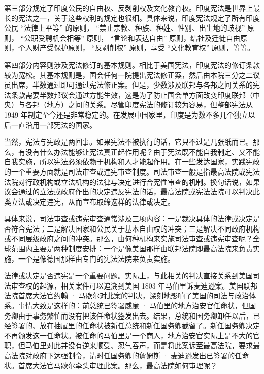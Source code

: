 第三部分规定了印度公民的自由权、反剥削权及文化教育权。印度宪法是世界上最长的宪法之一，关于这些权利的规定也很细。具体来说，印度宪法规定了所有印度公民 “法律上平等” 的原则， “禁止宗教、种族、种姓、性别、出生地的歧视” 原则， “公职受聘机会相等” 原则， “言论和表达自由” 原则，结社及迁徙自由原则，个人财产受保护原则， “反剥削权” 原则，享受 “文化教育权” 原则，等等。

第四部分内容则涉及宪法修订的基本规则。相比于美国宪法，印度宪法的修订条款较为宽松。其基本规则是，国会任何一院提出宪法修正案，然后由本院三分之二议员出席，半数通过即可通过宪法修正案。但是，少数涉及联邦与各邦之间关系的宪法条款需要半数邦议会通过方能生效，这是为了防止国会单方面改变印度联邦（中央）与各邦（地方）之间的关系。尽管印度宪法的修订较为容易，但整部宪法从 1949 年制定至今还是非常稳定的。在发展中国家里，印度是为数不多几个独立以后一直沿用一部宪法的国家。


当然，宪法与宪政是两回事。如果宪法不被执行的话，它只不过是几张纸而已。那么，有没有什么办法能够让宪法真正起作用呢？由于宪法既不能自我制定、又不能自我实施，所以宪法必须依赖于机构和人才能起作用。在一些发达国家，实践宪政的一个重要方面就是司法审查或违宪审查制度。司法审查一般是指最高法院或宪法法院对行政机构或立法机构的法律与决定进行合宪性审查的机制。换句话说，如果议会通过的立法或政府作出的决定违反宪法的话，最高法院或宪法法院可以判决此类立法或决定违宪，从而宣布取缔这样的法律或决定。

具体来说，司法审查或违宪审查通常涉及三项内容：一是裁决具体的法律或决定是否符合宪法；二是解决国家和公民关于基本自由权的冲突；三是解决不同政府机构或不同层级政府之间的冲突。那么，由何种机构来实施司法审查或违宪审查呢？全球范围内主要是两种制度安排：一个是像美国那样由联邦法院即最高法院来负责实施，一个是像德国那样由专门的宪法法院来负责实施。

法律或决定是否违宪是一个重要问题。实际上，与此相关的判决直接关系到美国司法审查权的起源，相关案件可以追溯到美国 1803 年马伯里诉麦迪逊案。美国联邦法院首席大法官约翰 · 马歇尔对此案的判决，深刻地影响了美国的司法与政治体系。事情大致是这样的：前总统已签署威廉 · 马伯里的地方治安官任命状，但国务卿由于事务繁忙而没有把该任命状签发出去。结果，总统和国务卿卸任以后，已经签署的、放在抽屉里的任命状被新任总统和新任国务卿截留了。新任国务卿决定不再颁发这一任命状。被任命的马伯里是一个商人，地方治安官实际上是不大的官职，但马伯里对此并没有逆来顺受、忍气吞声，而是将此案诉至最高法院，要求最高法院对政府下达强制令，请时任国务卿的詹姆斯 · 麦迪逊发出已签署的任命状。首席大法官马歇尔牵头审理此案。那么，最高法院如何审理呢？

